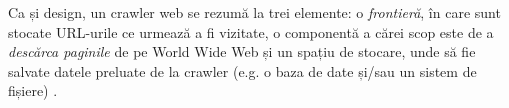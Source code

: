 Ca și design, un crawler web se rezumă la trei elemente: o \textit{frontieră}, în care sunt stocate URL-urile ce urmează a fi vizitate, o componentă a cărei scop este de a \textit{descărca paginile} de pe World Wide Web și un spațiu de stocare, unde să fie salvate datele preluate de la crawler (e.g. o baza de date și/sau un sistem de fișiere) \cite{Pantil, GautamPadminiFilippo}.
\\